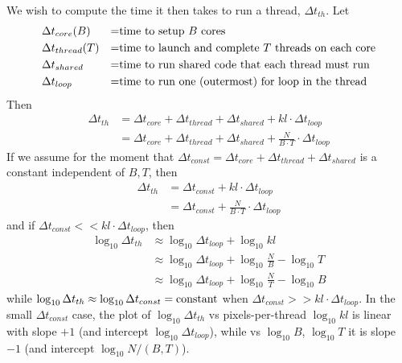 \documentclass[10pt]{article} %
\begin{document}
We wish to compute the time it then takes to run a thread, $\Delta t_{th}$. Let
\begin{align}
&\Delta t_{core}(B) &=& \hbox{\rm time to setup $B$ cores}\hfill\\
&\Delta t_{thread}(T) &=& \hbox{\rm time to launch and complete $T$ threads on each core}\\
&\Delta t_{shared} &=& \hbox{\rm time to run shared code that each thread must run}\\
&\Delta t_{loop} &=& \hbox{\rm time to run one (outermost) for loop in the thread}
\end{align}
Then 
\begin{align}
\Delta t_{th} &= \Delta t_{core}  + \Delta t_{thread}  + \Delta t_{shared}  + kl \cdot\Delta t_{loop} \\
&= \Delta t_{core}  + \Delta t_{thread}  + \Delta t_{shared}  + \frac{N}{B \cdot T} \cdot\Delta t_{loop}
\end{align}
If we assume for the moment that $ \Delta t_{const} =\Delta t_{core}  + \Delta t_{thread}  + \Delta t_{shared} $ is a constant independent of $B,T$, then
\begin{align}
\Delta t_{th} &= \Delta t_{const}  + kl \cdot\Delta t_{loop} \\
&= \Delta t_{const}   + \frac{N}{B \cdot T} \cdot\Delta t_{loop}
\end{align}
and if $ \Delta t_{const} << kl \cdot\Delta t_{loop} $, then 
\begin{align}
\log_{10}\Delta t_{th} &\approx \log_{10} \Delta t_{loop} +  \log_{10} kl \\
&\approx \log_{10} \Delta t_{loop}   + \log_{10} \frac{N}{B} - \log_{10} T  \\
&\approx \log_{10} \Delta t_{loop}   + \log_{10} \frac{N}{T} - \log_{10} B
\end{align}
while $\log_{10} \Delta t_{th} \approx  \log_{10} \Delta t_{const} = \hbox{\rm constant}$ when $\Delta t_{const} >> kl \cdot\Delta t_{loop} $.
In the small $ \Delta t_{const}$ case, the plot of $\log_{10} \Delta t_{th}$ vs pixels-per-thread $\log_{10} kl$ is linear with slope $+1$ (and intercept $\log_{10} \Delta t_{loop} $), while vs $\log_{10} B$, $\log_{10} T$ it is slope $-1$ (and intercept $\log_{10} N/(B,T)$). 
\end{document}
